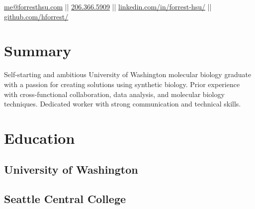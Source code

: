 \documentclass[]{forrest-resume-interfont}
\begin{document}
%
%

\lastupdated



%
%

{
\href{mailto:me@forresthsu.com}{me@forresthsu.com} || \href{tel:2063665909}{206.366.5909} || \href{https://www.linkedin.com/in/forrest-hsu/}{linkedin.com/in/forrest-hsu/} ||
\href{https://github.com/HForrest/}{github.com/hforrest/}
}

\section{Summary}
\raggedright
Self-starting and ambitious University of Washington molecular biology graduate with a passion for creating solutions using synthetic biology. 
Prior experience with cross-functional collaboration, data analysis, and molecular biology techniques.
Dedicated worker with strong communication and technical skills. 

\section{ Education}
\sectionsep
\subsection{University of Washington}

\sectionsep

\subsection{Seattle Central College}


\end{document}
